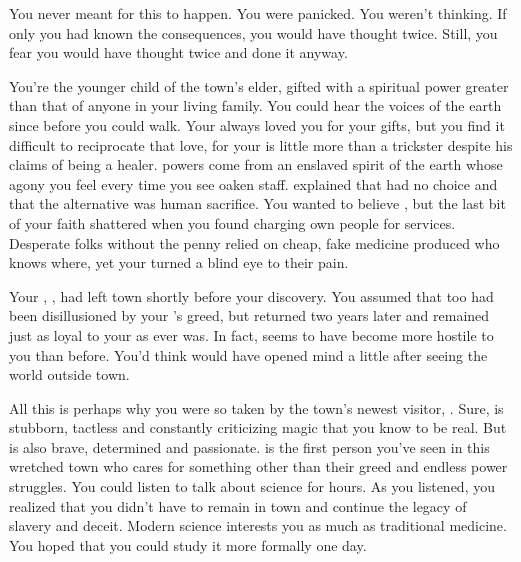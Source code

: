 \documentclass[char]{guildcamp4}
\begin{document}
\name{\cRebel{}}

You never meant for this to happen. You were panicked. You weren't thinking. If only you had known the consequences, you would have thought twice. Still, you fear you would have thought twice and done it anyway.

You're the younger child of the town's elder, gifted with a spiritual power greater than that of anyone in your living family. You could hear the voices of the earth since before you could walk. Your \cElder{\parent} always loved you for your gifts, but you find it difficult to reciprocate that love, for your \cElder{\parent} is little more than a trickster despite his claims of being a healer. \cElder{\Their} powers come from an enslaved spirit of the earth whose agony you feel every time you see \cElder{\their} oaken staff. \cElder{\They} explained that \cElder{\they} had no choice and that the alternative was human sacrifice. You wanted to believe \cElder{\them}, but the last bit of your faith shattered when you found \cElder{\them} charging \cElder{\their} own people for \cElder{\their} services. Desperate folks without the penny relied on cheap, fake medicine produced who knows where, yet your \cElder{\parent} turned a blind eye to their pain.

Your \cApprentice{\sibling}, \cApprentice{}, had left town shortly before your discovery. You assumed that \cApprentice{\they} too had been disillusioned by your \cElder{\parent}'s greed, but \cApprentice{\they} returned two years later and remained just as loyal to your \cElder{\parent} as \cApprentice{\they} ever was. In fact, \cApprentice{\they} seems to have become more hostile to you than before. You'd think \cApprentice{} would have opened \cApprentice{\their} mind a little after seeing the world outside town.   

All this is perhaps why you were so taken by the town's newest visitor, \cOutsider{\intro}. Sure, \cOutsider{\they} is stubborn, tactless and constantly criticizing magic that you know to be real. But \cOutsider{\they} is also brave, determined and passionate. \cOutsider{\They} is the first person you've seen in this wretched town who cares for something other than their greed and endless power struggles. You could listen to \cOutsider{\them} talk about \cOutsider{\their} science for hours. As you listened, you realized that you didn't have to remain in town and continue the legacy of slavery and deceit. Modern science interests you as much as traditional medicine. You hoped that you could study it more formally one day.
\end{document}
